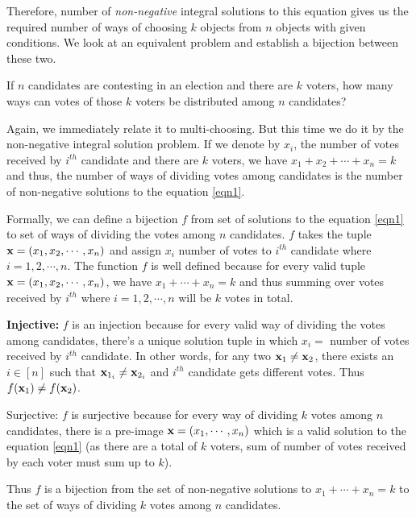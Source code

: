 Therefore, number of \emph{non-negative} integral solutions to this equation gives us the required number of ways of choosing $k$ objects from $n$ objects with given conditions. We look at an equivalent problem and establish a bijection between these two.

\begin{problem}
\label{voting-prob} 
If $n$ candidates are contesting in an election and there are $k$ voters, how many ways can votes of those $k$ voters be distributed among $n$ candidates? 
\end{problem}

Again, we immediately relate it to multi-choosing. But this time we do it by the non-negative integral solution problem.
If we denote by $x_i$, the number of votes received by $i^{th}$ candidate and there are $k$ voters, we have $x_1+x_2+\cdots+x_n=k$ and thus, the number of ways of dividing votes among candidates is the number of non-negative solutions to the equation \ref{eqn1}. 

Formally, we can define a bijection $f$ from set of solutions to the equation \ref{eqn1} to set of ways of dividing the votes among $n$ candidates. $f$ takes the tuple $\mathbf{x}=(x_1,x_2,\cdots,x_n)$ and assign $x_i$ number of votes to $i^{th}$ candidate where $i=1,2,\cdots,n$.
The function $f$ is well defined because for every valid tuple $\mathbf{x}=(x_1,x_2,\cdots,x_n)$, we have $x_1+\cdots+x_n=k$ and thus summing over votes received by $i^{th}$ where $i=1,2,\cdots,n$ will be $k$ votes in total. 
\begin{description}
\item\textbf{Injective:} $f$ is an injection because for every valid way of dividing the votes among candidates, there's a unique solution tuple in which $x_i = $ number of votes received by $i^{th}$ candidate. In other words, for any two $\mathbf{x}_1\neq\mathbf{x}_2$, there exists an $i\in[n]$ such that $\mathbf{x}_{1_i}\neq \mathbf{x}_{2_i}$ and $i^{th}$ candidate gets different votes. Thus $f(\mathbf{x}_1)\neq f(\mathbf{x}_2)$.
\item{Surjective:} $f$ is surjective because for every way of dividing $k$ votes among $n$ candidates, there is a pre-image $\mathbf{x}=(x_1,\cdots,x_n)$ which is a valid solution to the equation \ref{eqn1} (as there are a total of $k$ voters, sum of number of votes received by each voter must sum up to $k$). 
\end{description}
Thus $f$ is a bijection from the set of non-negative solutions to $x_1+\cdots+x_n=k$ to the set of ways of dividing $k$ votes among $n$ candidates.

